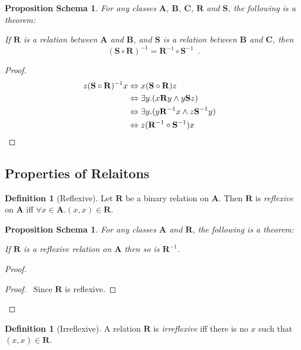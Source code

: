 \documentclass{book}
\let\qed\relax
\newtheorem{props}[ax]{Proposition Schema}
\theoremstyle{definition}
\newtheorem{df}[ax]{Definition}
\begin{document}
\begin{props}
For any classes $\mathbf{A}$, $\mathbf{B}$, $\mathbf{C}$, $\mathbf{R}$ and $\mathbf{S}$, the following is a theorem:

If $\mathbf{R}$ is a relation between $\mathbf{A}$ and $\mathbf{B}$, and $\mathbf{S}$ is a relation between $\mathbf{B}$ and $\mathbf{C}$, then
\[ (\mathbf{S} \circ \mathbf{R})^{-1} = \mathbf{R}^{-1} \circ \mathbf{S}^{-1} \enspace . \]
\end{props}

\begin{proof}
\pf
\begin{align*}
z(\mathbf{S} \circ \mathbf{R})^{-1}x & \Leftrightarrow x(\mathbf{S} \circ \mathbf{R})z \\
& \Leftrightarrow \exists y. (x \mathbf{R} y \wedge y \mathbf{S}z) \\
& \Leftrightarrow \exists y. (y \mathbf{R}^{-1} x \wedge z \mathbf{S}^{-1} y) \\
& \Leftrightarrow z (\mathbf{R}^{-1} \circ \mathbf{S}^{-1}) x & \qed
\end{align*}
\end{proof}

\subsection{Properties of Relaitons}

\begin{df}[Reflexive]
Let $\mathbf{R}$ be a binary relation on $\mathbf{A}$. Then $\mathbf{R}$ is \emph{reflexive} on $\mathbf{A}$ iff $\forall x \in \mathbf{A}. (x,x) \in \mathbf{R}$.
\end{df}

\begin{props}
\label{prop:invref}
For any classes $\mathbf{A}$ and $\mathbf{R}$, the following is a theorem:

If $\mathbf{R}$ is a reflexive relation on $\mathbf{A}$ then so is $\mathbf{R}^{-1}$.
\end{props}

\begin{proof}
\pf
{}
\begin{proof}
	\pf\ Since $\mathbf{R}$ is reflexive.
\end{proof}
\qed
\end{proof}

\begin{df}[Irreflexive]
A relation $\mathbf{R}$ is \emph{irreflexive} iff there is no $x$ such that $(x,x) \in \mathbf{R}$.
\end{df}
\end{document}
